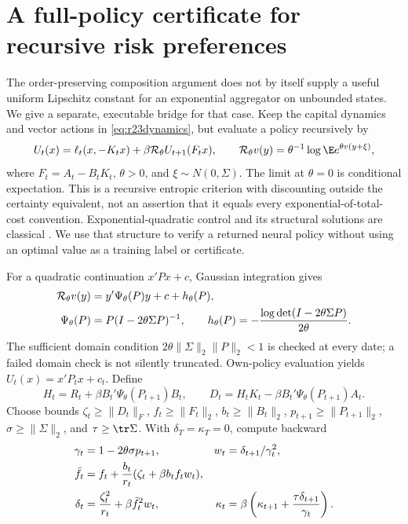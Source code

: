 \section{A full-policy certificate for recursive risk preferences}
\label{sec:r27entropic}
The order-preserving composition argument does not by itself supply a useful
uniform Lipschitz constant for an exponential aggregator on unbounded states.
We give a separate, executable bridge for that case. Keep the capital dynamics
and vector actions in \eqref{eq:r23dynamics}, but evaluate a policy recursively by
\begin{equation}\label{eq:r27entropicbellman}
 U_t(x)=\ell_t(x,-K_tx)+\beta\mathcal R_\theta U_{t+1}(F_tx),
 \qquad \mathcal R_\theta v(y)=\theta^{-1}\log\E e^{\theta v(y+\xi)},
\end{equation}
where $F_t=A_t-B_tK_t$, $\theta>0$, and $\xi\sim N(0,\Sigma)$.
The limit at $\theta=0$ is conditional expectation. This is a recursive
entropic criterion with discounting outside the certainty equivalent, not an
assertion that it equals every exponential-of-total-cost convention.
Exponential-quadratic control and its structural solutions are classical
\citep{r27jacobson1973,r27cui2023}. We use that structure to verify a returned
neural policy without using an optimal value as a training label or certificate.

For a quadratic continuation $x'Px+c$, Gaussian integration gives
\begin{align}
 \mathcal R_\theta v(y)&=y'\Psi_\theta(P)y+c+h_\theta(P),\notag\\
 \Psi_\theta(P)&=P(I-2\theta\Sigma P)^{-1},\qquad
 h_\theta(P)=-\frac{\log\det(I-2\theta\Sigma P)}{2\theta}.
 \label{eq:r27gaussian}
\end{align}
The sufficient domain condition $2\theta\|\Sigma\|_2\|P\|_2<1$
is checked at every date; a failed domain check is not silently truncated.
Own-policy evaluation yields $U_t(x)=x'P_tx+c_t$. Define
\[
 H_t=R_t+\beta B_t'\Psi_\theta(P_{t+1})B_t,\qquad
 D_t=H_tK_t-\beta B_t'\Psi_\theta(P_{t+1})A_t.
\]
Choose bounds $\zeta_t\geq\|D_t\|_F$, $f_t\geq\|F_t\|_2$,
$b_t\geq\|B_t\|_2$, $p_{t+1}\geq\|P_{t+1}\|_2$,
$\sigma\geq\|\Sigma\|_2$, and $\tau\geq\tr\Sigma$.
With $\delta_T=\kappa_T=0$, compute backward
\begin{align}
 \gamma_t&=1-2\theta\sigma p_{t+1},&
 w_t&=\delta_{t+1}/\gamma_t^2,\notag\\
 \bar f_t&=f_t+\frac{b_t}{r_t}
             (\zeta_t+\beta b_tf_tw_t),\notag\\
 \delta_t&=\frac{\zeta_t^2}{r_t}+\beta\bar f_t^2w_t,&
 \kappa_t&=\beta\left(\kappa_{t+1}+
                   \frac{\tau\delta_{t+1}}{\gamma_t}\right).
 \label{eq:r27riskenvelope}
\end{align}

